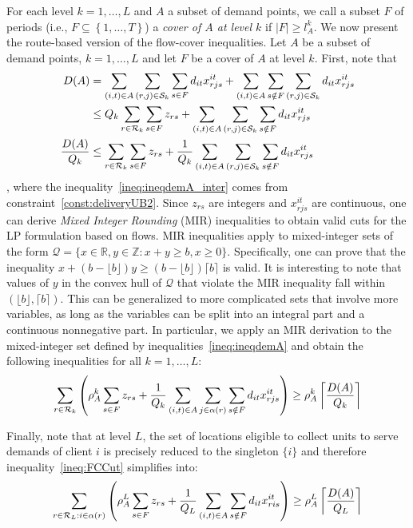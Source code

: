For each level $k=1,\ldots,L$ and $A$ a subset of demand points, we call a subset $F$ of periods (i.e., $F\subseteq \left\{1,\ldots,T\right\}$) a {\em cover of $A$ at level $k$} if $|F|\geq l^k_A$.
We now present the route-based version of the flow-cover inequalities. 
Let $A$ be a subset of demand points, $k=1,\ldots, L$ and let $F$ be a cover of $A$ at level $k$. First, note that 
\begin{align}
    D(A) &= \sum_{(i,t)\in A} \sum_{(r,j)\in\mathcal{S}_k} \sum_{s\in F} d_{it}x^{it}_{rjs}+  \sum_{(i,t)\in A}\sum_{s\notin F}\sum_{(r,j)\in\mathcal{S}_k} d_{it}x^{it}_{rjs}\nonumber\\
         &\leq Q_k \sum_{r\in\mathcal{R}_k}\sum_{s\in F} z_{rs}+  \sum_{(i,t)\in A}\sum_{(r,j)\in\mathcal{S}_k}\sum_{s\notin F} d_{it}x^{it}_{rjs}\label{ineq:ineqdemA_inter}\\
    \frac{D(A)}{Q_k}&\leq \sum_{r\in\mathcal{R}_k}\sum_{s\in F} z_{rs}+  \frac{1}{Q_k} \sum_{(i,t)\in A}\sum_{(r,j)\in\mathcal{S}_k}\sum_{s\notin F} d_{it}x^{it}_{rjs}\label{ineq:ineqdemA}
\end{align}
, where the inequality~\eqref{ineq:ineqdemA_inter} comes from constraint~\eqref{const:deliveryUB2}. 
Since $z_{rs}$ are integers and $x^{it}_{rjs}$ are continuous, one can derive {\em Mixed Integer Rounding} (MIR) inequalities to obtain valid cuts for the LP formulation based on flows.
MIR inequalities apply to mixed-integer sets of the form $\mathcal{Q} = \{x\in\mathbb{R}, y\in\mathbb{Z} : x+y\geq b, x\geq 0\}$. 
Specifically, one can prove that the inequality $x+(b-\lfloor b\rfloor) y \geq (b-\lfloor b \rfloor)\lceil b\rceil$ is valid. 
It is interesting to note that values of $y$ in the convex hull of $\mathcal{Q}$ that violate the MIR inequality fall within $(\lfloor b\rfloor, \lceil b \rceil)$.
This can be generalized to more complicated sets that involve more variables, as long as the variables can be split into an integral part and a continuous nonnegative part. 
In particular, we apply an MIR derivation to the mixed-integer set defined by inequalities~\eqref{ineq:ineqdemA} and obtain the following inequalities for all $k=1,\ldots,L$:
\begin{equation}
    \sum_{r\in\mathcal{R}_k} \left(\rho^k_A  \sum_{s\in F} z_{rs}+  \frac{1}{Q_k} \sum_{(i,t)\in A}\sum_{j\in\alpha(r)}\sum_{s\notin F} d_{it}x^{it}_{rjs}\right)\geq \rho^k_A \left\lceil\frac{D(A)}{Q_k}\right\rceil   \label{ineq:FCCut}
\end{equation}

Finally, note that at level $L$, the set of locations eligible to collect units to serve demands of client $i$ is precisely reduced to the singleton $\{i\}$ and therefore inequality~\eqref{ineq:FCCut} simplifies into:
\begin{equation}
    \sum_{r\in\mathcal{R}_L:i\in\alpha(r)} \left(\rho^L_A  \sum_{s\in F} z_{rs}+  \frac{1}{Q_L} \sum_{(i,t)\in A}\sum_{s\notin F} d_{it}x^{it}_{ris}\right)\geq \rho^L_A \left\lceil\frac{D(A)}{Q_L}\right\rceil   \label{ineq:FCCutClient}
\end{equation}

